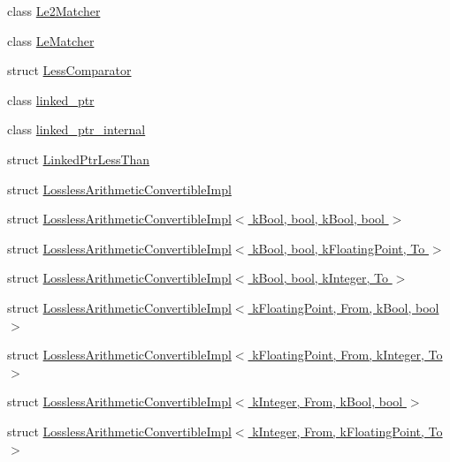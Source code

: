 \begin{DoxyCompactItemize}
class \hyperlink{classtesting_1_1internal_1_1Le2Matcher}{Le2\+Matcher}
\item 
class \hyperlink{classtesting_1_1internal_1_1LeMatcher}{Le\+Matcher}
\item 
struct \hyperlink{structtesting_1_1internal_1_1LessComparator}{Less\+Comparator}
\item 
class \hyperlink{classtesting_1_1internal_1_1linked__ptr}{linked\+\_\+ptr}
\item 
class \hyperlink{classtesting_1_1internal_1_1linked__ptr__internal}{linked\+\_\+ptr\+\_\+internal}
\item 
struct \hyperlink{structtesting_1_1internal_1_1LinkedPtrLessThan}{Linked\+Ptr\+Less\+Than}
\item 
struct \hyperlink{structtesting_1_1internal_1_1LosslessArithmeticConvertibleImpl}{Lossless\+Arithmetic\+Convertible\+Impl}
\item 
struct \hyperlink{structtesting_1_1internal_1_1LosslessArithmeticConvertibleImpl_3_01kBool_00_01bool_00_01kBool_00_01bool_01_4}{Lossless\+Arithmetic\+Convertible\+Impl$<$ k\+Bool, bool, k\+Bool, bool $>$}
\item 
struct \hyperlink{structtesting_1_1internal_1_1LosslessArithmeticConvertibleImpl_3_01kBool_00_01bool_00_01kFloatingPoint_00_01To_01_4}{Lossless\+Arithmetic\+Convertible\+Impl$<$ k\+Bool, bool, k\+Floating\+Point, To $>$}
\item 
struct \hyperlink{structtesting_1_1internal_1_1LosslessArithmeticConvertibleImpl_3_01kBool_00_01bool_00_01kInteger_00_01To_01_4}{Lossless\+Arithmetic\+Convertible\+Impl$<$ k\+Bool, bool, k\+Integer, To $>$}
\item 
struct \hyperlink{structtesting_1_1internal_1_1LosslessArithmeticConvertibleImpl_3_01kFloatingPoint_00_01From_00_01kBool_00_01bool_01_4}{Lossless\+Arithmetic\+Convertible\+Impl$<$ k\+Floating\+Point, From, k\+Bool, bool $>$}
\item 
struct \hyperlink{structtesting_1_1internal_1_1LosslessArithmeticConvertibleImpl_3_01kFloatingPoint_00_01From_00_01kInteger_00_01To_01_4}{Lossless\+Arithmetic\+Convertible\+Impl$<$ k\+Floating\+Point, From, k\+Integer, To $>$}
\item 
struct \hyperlink{structtesting_1_1internal_1_1LosslessArithmeticConvertibleImpl_3_01kInteger_00_01From_00_01kBool_00_01bool_01_4}{Lossless\+Arithmetic\+Convertible\+Impl$<$ k\+Integer, From, k\+Bool, bool $>$}
\item 
struct \hyperlink{structtesting_1_1internal_1_1LosslessArithmeticConvertibleImpl_3_01kInteger_00_01From_00_01kFloatingPoint_00_01To_01_4}{Lossless\+Arithmetic\+Convertible\+Impl$<$ k\+Integer, From, k\+Floating\+Point, To $>$}

\end{DoxyCompactItemize}

